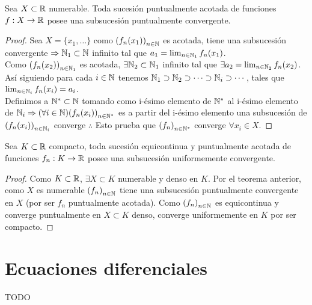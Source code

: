 \begin{theorem}
  Sea \(X \subset \mathbb{R} \) numerable. Toda sucesión puntualmente acotada de funciones \(f: X \to \mathbb{R} \) posee una subsucesión puntualmente convergente.
  \begin{proof}
    Sea \(X = \{x_1, \ldots \} \) como \({(f_n(x_1))}_{n \in \mathbb{N}} \) es acotada, tiene una subsucesión convergente \(\Rightarrow \mathbb{N}_1 \subset \mathbb{N} \) infinito tal que \(a_1 = \lim_{n \in \mathbb{N}_1} f_n(x_1)\). \\
    Como \({(f_n(x_2))}_{n \in \mathbb{N}_1} \) es acotada, \(\exists \mathbb{N}_2 \subset \mathbb{N}_1\) infinito tal que \(\exists a_2 = \lim_{n \in \mathbb{N}_2} f_n(x_2)\). Así siguiendo para cada \(i \in \mathbb{N} \) tenemos \(\mathbb{N}_1 \supset \mathbb{N}_2 \supset \cdots \supset \mathbb{N}_i \supset \cdots \), tales que \(\lim_{n \in \mathbb{N}_i} f_n(x_i) = a_i\). \\
    Definimos a \(\mathbb{N}^* \subset \mathbb{N} \) tomando como i-ésimo elemento de \(\mathbb{N}^*\) al i-ésimo elemento de \(\mathbb{N}_i \Rightarrow (\forall i \in \mathbb{N}) {(f_n(x_i))}_{n \in \mathbb{N}^*} \) es a partir del i-ésimo elemento una subsucesión de \({(f_n(x_i))}_{n \in \mathbb{N}_i} \) converge \(\therefore \) Esto prueba que \({(f_n)}_{n \in \mathbb{N}^*} \) converge \(\forall x_i \in X\).
  \end{proof}
\end{theorem}

\begin{theorem}
  Sea \(K \subset \mathbb{R} \) compacto, toda sucesión equicontinua y puntualmente acotada de funciones \(f_n: K \to \mathbb{R} \) posee una subsucesión uniformemente convergente.
  \begin{proof}
    Como \(K \subset \mathbb{R} \), \(\exists X \subset K\) numerable y denso en \(K\). Por el teorema anterior, como \(X\) es numerable \({(f_n)}_{n \in \mathbb{N}} \) tiene una subsucesión puntualmente convergente en \(X\) (por ser \(f_n\) puntualmente acotada). Como \({(f_n)}_{n \in \mathbb{N}} \) es equicontinua y converge puntualmente en \(X \subset K\) denso, converge uniformemente en \(K\) por ser compacto.
  \end{proof}
\end{theorem}

\section{Ecuaciones diferenciales}
TODO
